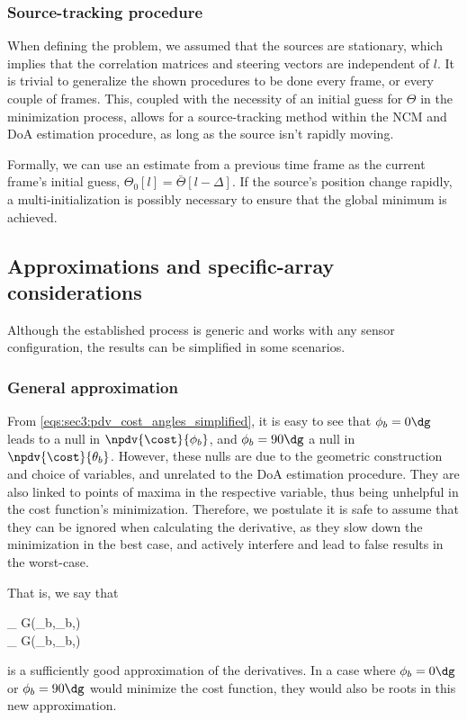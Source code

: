 \subsubsection*{Source-tracking procedure}

When defining the problem, we assumed that the sources are stationary, which implies that the correlation matrices and steering vectors are independent of $l$. It is trivial to generalize the shown procedures to be done every frame, or every couple of frames. This, coupled with the necessity of an initial guess for $\Theta$ in the minimization process, allows for a source-tracking method within the NCM and DoA estimation procedure, as long as the source isn't rapidly moving.

Formally, we can use an estimate from a previous time frame as the current frame's initial guess, $\Theta_0[l] = \bar{\Theta}[l-\Delta]$. If the source's position change rapidly, a multi-initialization is possibly necessary to ensure that the global minimum is achieved.

\subsection{Approximations and specific-array considerations}
\label{subsec:sec3:approximations_specific-array_considerations}

Although the established process is generic and works with any sensor configuration, the results can be simplified in some scenarios.

\subsubsection*{General approximation}

From \cref{eqs:sec3:pdv_cost_angles_simplified}, it is easy to see that $\phi_b = 0\dg$ leads to a null in $\npdv{\cost}{\phi_b}$, and $\phi_b = 90\dg$ a null in $\npdv{\cost}{\theta_b}$. However, these nulls are due to the geometric construction and choice of variables, and unrelated to the DoA estimation procedure. They are also linked to points of maxima in the respective variable, thus being unhelpful in the cost function's minimization. Therefore, we postulate it is safe to assume that they can be ignored when calculating the derivative, as they slow down the minimization in the best case, and actively interfere and lead to false results in the worst-case.

That is, we say that
\begin{subgather}
	 \approx \sum_{} \sin{} \cos\pts{\lambda_{\bvj}} G(\theta_b,\phi_b,\bvj) \\
	 \approx \sum_{} \cos{} \cos\pts{\lambda_{\bvj}} G(\theta_b,\phi_b,\bvj)
\end{subgather}
is a sufficiently good approximation of the derivatives. In a case where $\phi_b = 0\dg$ or $\phi_b = 90\dg$ would minimize the cost function, they would also be roots in this new approximation.

